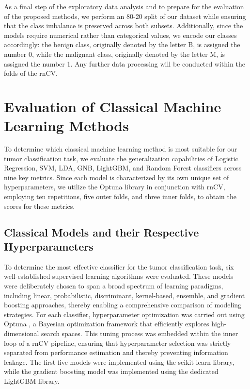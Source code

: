 \documentclass[en]{dimscthesis}
\begin{document}
As a final step of the exploratory data analysis and to prepare for the evaluation of the proposed methods, we perform an 80-20 split of our dataset while ensuring that the class imbalance is preserved across both subsets. Additionally, since the models require numerical rather than categorical values, we encode our classes accordingly: the benign class, originally denoted by the letter B, is assigned the number 0, while the malignant class, originally denoted by the letter M, is assigned the number 1. Any further data processing will be conducted within the folds of the rnCV.

\section{Evaluation of Classical Machine Learning Methods} \label{clas_eval}

To determine which classical machine learning method is most suitable for our tumor classification task, we evaluate the generalization capabilities of Logistic Regression, SVM, LDA, GNB, LightGBM, and Random Forest classifiers across nine key metrics. Since each model is characterized by its own unique set of hyperparameters, we utilize the Optuna \cite{bib:optuna} library in conjunction with rnCV, employing ten repetitions, five outer folds, and three inner folds, to obtain the scores for these metrics.

\subsection{Classical Models and their Respective Hyperparameters} \label{clas_models}

To determine the most effective classifier for the tumor classification task, six well-established supervised learning algorithms were evaluated. These models were deliberately chosen to span a broad spectrum of learning paradigms, including linear, probabilistic, discriminant, kernel-based, ensemble, and gradient boosting approaches, thereby enabling a comprehensive comparison of modeling strategies. For each classifier, hyperparameter optimization was carried out using Optuna \cite{bib:optuna}, a Bayesian optimization framework that efficiently explores high-dimensional search spaces. This tuning process was embedded within the inner loop of a rnCV pipeline, ensuring that hyperparameter selection was strictly separated from performance estimation and thereby preventing information leakage. The first five models were implemented using the scikit-learn \cite{bib:sklearn_api} library, while the gradient boosting model was implemented using the dedicated LightGBM \cite{bib:lightgbm_library} library.
\end{document}
